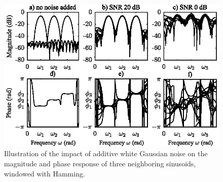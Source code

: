 \begin{figure}[t]
	\center %
	\includegraphics{figures/figure3_4.eps}
	\caption{Illustration of the impact of additive white Gaussian noise on the magnitude and phase response of three neighboring sinusoids, windowed with Hamming.}\label{Figure34}
\end{figure}


